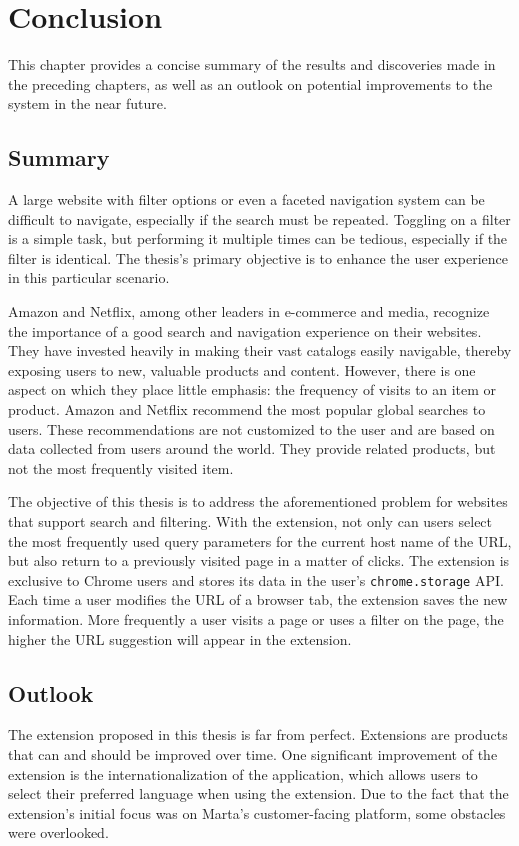 \newpage
\chapter{Conclusion}
This chapter provides a concise summary of the results and discoveries made in the preceding chapters, as well as an outlook on potential improvements to the system in the near future.

\section{Summary}
A large website with filter options or even a faceted navigation system can be difficult to navigate, especially if the search must be repeated. Toggling on a filter is a simple task, but performing it multiple times can be tedious, especially if the filter is identical. The thesis's primary objective is to enhance the user experience in this particular scenario.

Amazon and Netflix, among other leaders in e-commerce and media, recognize the importance of a good search and navigation experience on their websites. They have invested heavily in making their vast catalogs easily navigable, thereby exposing users to new, valuable products and content. However, there is one aspect on which they place little emphasis: the frequency of visits to an item or product. Amazon and Netflix recommend the most popular global searches to users. These recommendations are not customized to the user and are based on data collected from users around the world. They provide related products, but not the most frequently visited item.

The objective of this thesis is to address the aforementioned problem for websites that support search and filtering. With the extension, not only can users select the most frequently used query parameters for the current host name of the URL, but also return to a previously visited page in a matter of clicks. The extension is exclusive to Chrome users and stores its data in the user's \texttt{chrome.storage} API. Each time a user modifies the URL of a browser tab, the extension saves the new information. More frequently a user visits a page or uses a filter on the page, the higher the URL suggestion will appear in the extension.

\section{Outlook}
The extension proposed in this thesis is far from perfect. Extensions are products that can and should be improved over time. One significant improvement of the extension is the internationalization of the application, which allows users to select their preferred language when using the extension. Due to the fact that the extension's initial focus was on Marta's customer-facing platform, some obstacles were overlooked.

